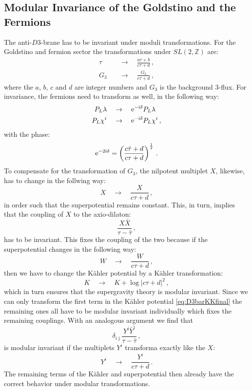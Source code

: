 \documentclass[a4paper,12pt]{report}
\newcommand{\be}{\begin{equation}}
\newcommand{\ee}{\end{equation}}
\newcommand{\bea}{\begin{equation}\begin{aligned}}
\newcommand{\eea}{\end{aligned}\end{equation}}
\def\rmi{{\rm i}}
\def\rme{{\rm e}}
\def\jb{{\bar \jmath}}
\begin{document}
\subsection{Modular Invariance of the Goldstino and the Fermions}
The anti-$D3$-brane has to be invariant under moduli transformations. For the Goldstino and fermion sector the transformations under $SL(2,\mathbb{Z})$ are:
\bea 
\tau \quad &\to \quad \frac{a\tau + b}{c \tau + d}\,,\\
G_3 \quad &\to \quad \frac{G_3}{c\tau + d}\,,
\eea 
where the $a$, $b$, $c$ and $d$ are integer numbers and $G_3$ is the background 3-flux. For invariance, the fermions need to transform as well, in the following way:
\bea 
P_L \lambda \quad &\to \quad \rme^{-\rmi \delta} P_L \lambda \\
P_L \chi^i \quad &\to \quad \rme^{-\rmi \delta} P_L \chi^i\,,
\eea 
with the phase:
\be 
\rme^{-2\rmi\delta} = \left( \frac{c\bar{\tau}+d}{c \tau + d} \right)^{\frac{1}{2}}\,.
\ee
To compensate for the transformation of $G_3$, the nilpotent multiplet $X$, likewise, has to change in the follwing way:
\be 
X \quad \to \quad \frac{X}{c\tau + d}\,,
\ee
in order such that the superpotential remains constant. This, in turn, implies that the coupling of $X$ to the axio-dilaton:
\be 
\frac{X \bar{X}}{\tau-\bar{\tau}}\,,
\ee
has to be invariant. This fixes the coupling of the two because if the superpotential changes in the following way:
\be 
W \quad \to \quad \frac{W}{c\tau + d}\,,
\ee
then we have to change the Kähler potential by a Kähler transformation:
\be 
K \quad \to \quad K + \log | c \tau + d |^2\,,
\ee
which in turn ensures that the supergravity theory is modular invariant. Since we can only transform the first term in the Kähler potential \eqref{eq:D3barKKfinal} the remaining ones all have to be modular invariant individually which fixes the remaining couplings. With an analogous argument we find that 
\be 
\delta_{i\jb} \frac{Y^i \bar{Y}^\jb}{\tau-\bar{\tau}}\,,
\ee
is modular invariant if the multiplets $Y^i$ transforma exactly like the $X$:
\be 
Y^i \quad \to \quad \frac{Y^i}{c\tau +d}\,.
\ee
The remaining terms of the Kähler and superpotential then already have the correct behavior under modular transformations.
\end{document}
